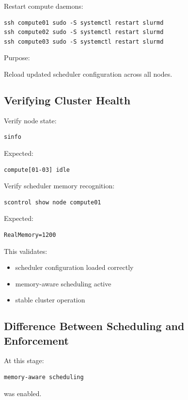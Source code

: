 \documentclass[11pt]{article}
\begin{document}
Restart compute daemons:

\begin{verbatim}
ssh compute01 sudo -S systemctl restart slurmd
ssh compute02 sudo -S systemctl restart slurmd
ssh compute03 sudo -S systemctl restart slurmd
\end{verbatim}

Purpose:

Reload updated scheduler configuration across all nodes.
\subsection{Verifying Cluster Health}
\label{sec:orgd318d28}

Verify node state:

\begin{verbatim}
sinfo
\end{verbatim}

Expected:

\begin{verbatim}
compute[01-03] idle
\end{verbatim}

Verify scheduler memory recognition:

\begin{verbatim}
scontrol show node compute01
\end{verbatim}

Expected:

\begin{verbatim}
RealMemory=1200
\end{verbatim}

This validates:

\begin{itemize}
\item scheduler configuration loaded correctly
\item memory-aware scheduling active
\item stable cluster operation
\end{itemize}
\subsection{Difference Between Scheduling and Enforcement}
\label{sec:org7814bc0}

At this stage:

\begin{verbatim}
memory-aware scheduling
\end{verbatim}

was enabled.
\end{document}
